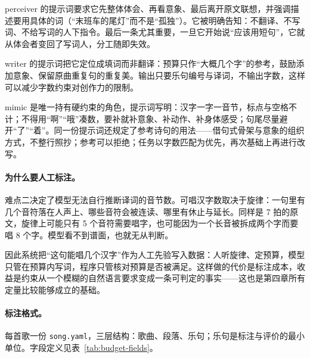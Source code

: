 \documentclass[12pt, a4paper]{ctexart}
\numberwithin{table}{section}
\numberwithin{figure}{section}
\begin{document}
perceiver 的提示词要求它先整体体会、再看意象、最后离开原文联想，并强调描述要用具体的词（“末班车的尾灯”而不是“孤独”）。它被明确告知：不翻译、不写词、不给写词的人下指令。最后一条尤其重要，一旦它开始说“应该用短句”，它就从体会者变回了写词人，分工随即失效。

writer 的提示词把它定位成填词而非翻译：预算只作“大概几个字”的参考，鼓励添加意象、保留原曲重复句的重复美。输出只要乐句编号与译词，不输出字数，这样可以减少字数约束对创作力的限制。

mimic 是唯一持有硬约束的角色，提示词写明：汉字一字一音节，标点与空格不计；不得用“啊”“哦”凑数，要补就补意象、补动作、补身体感受；句尾尽量避开“了”“着”。同一份提示词还规定了参考诗句的用法——借句式骨架与意象的组织方式，不整行照抄；参考可以拒绝；任务以字数匹配为优先，再次基础上再进行改写。


\paragraph{为什么要人工标注。}
难点二决定了模型无法自行推断译词的音节数。可唱汉字数取决于旋律：一句里有几个音符落在人声上、哪些音符会被连读、哪里有休止与延长。同样是 7 拍的原文，旋律上可能只有 5 个音符需要唱字，也可能因为一个长音被拆成两个字而要唱 8 个字。模型看不到谱面，也就无从判断。

因此系统把“这句能唱几个汉字”作为人工先验写入数据：人听旋律、定预算，模型只管在预算内写词，程序只管核对预算是否被满足。这样做的代价是标注成本，收益是约束从一个模糊的自然语言要求变成一条可判定的事实——这也是第四章所有定量比较能够成立的基础。

\paragraph{标注格式。}
每首歌一份 \texttt{song.yaml}，三层结构：歌曲、段落、乐句；乐句是标注与评价的最小单位。字段定义见表~\ref{tab:budget-fields}。
\end{document}
